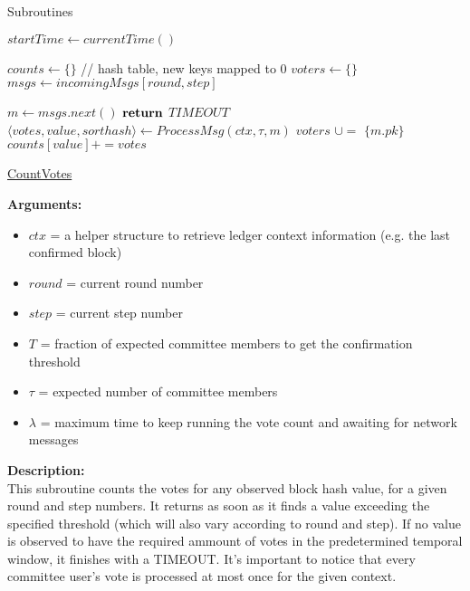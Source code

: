 \documentclass[10pt,a4paper]{article}
\begin{document}
\begin{section}{Subroutines}\label{sect:soubroutines}

\begin{algorithm}[H]
    \begin{algorithmic}[H]

    \State $startTime \gets currentTime()$

    \State $counts \gets \{\}$ // hash table, new keys mapped to 0
    \State $voters \gets \{\}$
    \State $msgs \gets incomingMsgs[round,step]$

        \State $m \gets msgs.next()$
                \State $\Return$ $TIMEOUT$
            \EndIf
        \Else
            \State $ \langle votes, value, sorthash \rangle \gets ProcessMsg(ctx, \tau, m)$
            \State $voters$ $\cup=$ $\{m.pk\}$
            \State $counts[value] += votes$
        \EndIf
    \EndWhile
    \EndFunction
    \end{algorithmic}
    \caption{\underline{CountVotes}}
\end{algorithm}

\noindent \textbf{Arguments:}
\begin{itemize}
    \item $ctx$ = a helper structure to retrieve ledger context information (e.g. the last confirmed block)
    \item $round$ = current round number
    \item $step$ = current step number
    \item $T$ = fraction of expected committee members to get the confirmation threshold
    \item $\tau$ = expected number of committee members
    \item $\lambda$ = maximum time to keep running the vote count and awaiting for network messages
  \end{itemize}

\noindent \textbf{Description:}\\
This subroutine counts the votes for any observed block hash value, for a given round and step numbers.
It returns as soon as it finds a value exceeding the specified threshold (which will also vary according to round and step).
If no value is observed to have the required ammount of votes in the predetermined temporal window, it finishes with a TIMEOUT.
It's important to notice that every committee user's vote is processed at most once for the given context.\\


\end{section}
\end{document}
